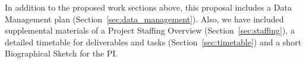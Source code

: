 
In addition to the proposed work sections above, this proposal includes 
a Data Management plan (Section~\ref{sec:data_management}). 
Also, we
have included supplemental materials of a Project Staffing Overview
(Section~\ref{sec:staffing}), a detailed timetable for deliverables and tasks
(Section~\ref{sec:timetable}) 
and a short Biographical Sketch for the PI.
